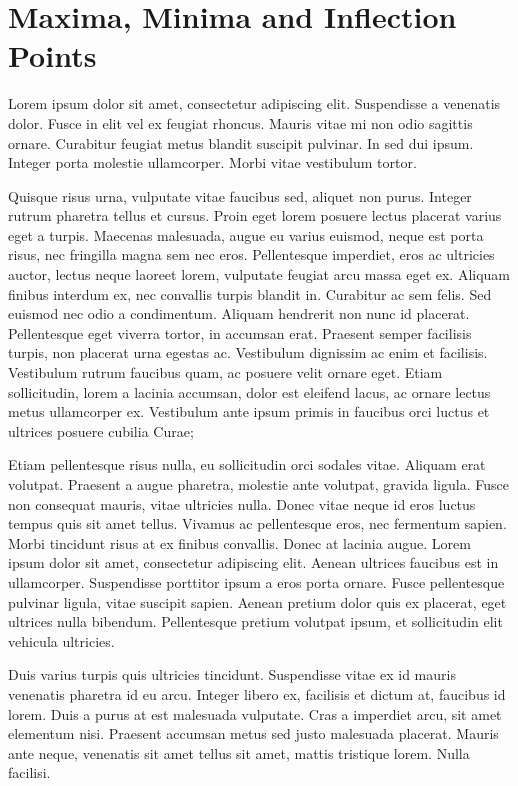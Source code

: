\chapter{Maxima, Minima and Inflection Points}
\label{ch:08}

Lorem ipsum dolor sit amet, consectetur adipiscing elit. Suspendisse a venenatis dolor. Fusce in elit vel ex feugiat rhoncus. Mauris vitae mi non odio sagittis ornare. Curabitur feugiat metus blandit suscipit pulvinar. In sed dui ipsum. Integer porta molestie ullamcorper. Morbi vitae vestibulum tortor.

Quisque risus urna, vulputate vitae faucibus sed, aliquet non purus. Integer rutrum pharetra tellus et cursus. Proin eget lorem posuere lectus placerat varius eget a turpis. Maecenas malesuada, augue eu varius euismod, neque est porta risus, nec fringilla magna sem nec eros. Pellentesque imperdiet, eros ac ultricies auctor, lectus neque laoreet lorem, vulputate feugiat arcu massa eget ex. Aliquam finibus interdum ex, nec convallis turpis blandit in. Curabitur ac sem felis. Sed euismod nec odio a condimentum. Aliquam hendrerit non nunc id placerat. Pellentesque eget viverra tortor, in accumsan erat. Praesent semper facilisis turpis, non placerat urna egestas ac. Vestibulum dignissim ac enim et facilisis. Vestibulum rutrum faucibus quam, ac posuere velit ornare eget. Etiam sollicitudin, lorem a lacinia accumsan, dolor est eleifend lacus, ac ornare lectus metus ullamcorper ex. Vestibulum ante ipsum primis in faucibus orci luctus et ultrices posuere cubilia Curae;

Etiam pellentesque risus nulla, eu sollicitudin orci sodales vitae. Aliquam erat volutpat. Praesent a augue pharetra, molestie ante volutpat, gravida ligula. Fusce non consequat mauris, vitae ultricies nulla. Donec vitae neque id eros luctus tempus quis sit amet tellus. Vivamus ac pellentesque eros, nec fermentum sapien. Morbi tincidunt risus at ex finibus convallis. Donec at lacinia augue. Lorem ipsum dolor sit amet, consectetur adipiscing elit. Aenean ultrices faucibus est in ullamcorper. Suspendisse porttitor ipsum a eros porta ornare. Fusce pellentesque pulvinar ligula, vitae suscipit sapien. Aenean pretium dolor quis ex placerat, eget ultrices nulla bibendum. Pellentesque pretium volutpat ipsum, et sollicitudin elit vehicula ultricies.

Duis varius turpis quis ultricies tincidunt. Suspendisse vitae ex id mauris venenatis pharetra id eu arcu. Integer libero ex, facilisis et dictum at, faucibus id lorem. Duis a purus at est malesuada vulputate. Cras a imperdiet arcu, sit amet elementum nisi. Praesent accumsan metus sed justo malesuada placerat. Mauris ante neque, venenatis sit amet tellus sit amet, mattis tristique lorem. Nulla facilisi.

